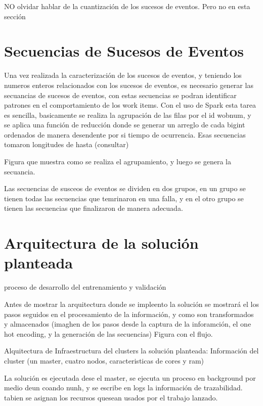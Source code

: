 NO olvidar hablar de la cuantización de los sucesos de eventos. Pero no en esta sección


\section{Secuencias de Sucesos de Eventos } %
\label{section2.2}

Una vez realizada la caracterización de los sucesos de eventos, y teniendo los numeros enteros relacionados con los sucesos de eventos, es necesario generar las secuancias de sucesos de eventos, con estas secuencias se podran identificar patrones en el comportamiento de los work items. Con el uso de Spark esta tarea es sencilla, basicamente se realiza la agrupación de las filas por el id wobnum, y se aplica una función de reducción donde se generar un arreglo de cada bigint ordenados de manera desendente por si tiempo de ocurrencia. Esas secuencias tomaron longitudes de hasta (consultar)

Figura que muestra como se realiza el agrupamiento, y luego se genera la secuancia. 


Las secuencias de susceos de eventos se dividen en dos grupos, en un grupo se tienen todas las secuencias que temrinaron en una falla, y en el otro grupo se tienen las secuencias que finalizaron de manera adecuada.




\section{Arquitectura de la solución planteada} %
\label{section2.3}

proceso de desarrollo del entrenamiento y validación

Antes de mostrar la arquitectura donde se impleento la solución se mostrará el los pasos seguidos en el procesamiento de la información, y como son transformados y almacenados (imaghen de los pasos desde la captura de la inforamción, el one hot encoding, y la generación de las secuencias)
Figura con el flujo.

Alquitectura de Infraestructura del clusters la solución planteada: Información del cluster (un master, cuatro nodos, caracteristicas de cores y ram)

La solución es ejecutada dese el master, se ejecuta un proceso en background por medio deun coando nunh, y se escribe en logs la información de trazabilidad. tabien se asignan los recursos quesean usados por el trabajo lanzado. 


